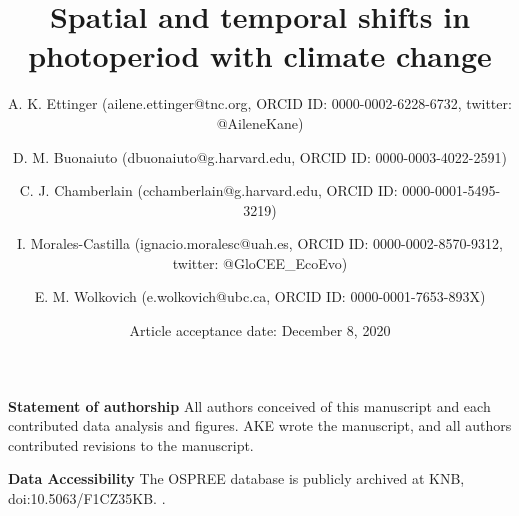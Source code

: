 \documentclass{article}
\begin{document}



\title{Spatial and temporal shifts in photoperiod with climate change} %


\author[1,2,a]{A. K. Ettinger (ailene.ettinger@tnc.org, ORCID ID:  0000-0002-6228-6732, twitter: @AileneKane)}
\author[2,3]{D. M. Buonaiuto (dbuonaiuto@g.harvard.edu, ORCID ID: 0000-0003-4022-2591)}

\author[2,3]{C. J. Chamberlain (cchamberlain@g.harvard.edu, ORCID ID: 0000-0001-5495-3219)}

\author[2,3,4,5]{I. Morales-Castilla (ignacio.moralesc@uah.es, ORCID ID: 0000-0002-8570-9312, twitter: @GloCEE\_EcoEvo)}

\author[2,3,6]{E. M. Wolkovich (e.wolkovich@ubc.ca, ORCID ID: 0000-0001-7653-893X)}






 


\date{Article acceptance date: December 8, 2020} 

\maketitle %
\textbf{Statement of authorship} 
All authors conceived of this manuscript and each contributed data analysis and figures. AKE wrote the manuscript, and all authors contributed revisions to the manuscript. 

\textbf{Data Accessibility} The OSPREE database is publicly archived at KNB, doi:10.5063/F1CZ35KB. \citep{wolkovich2019}.
\end{document}
